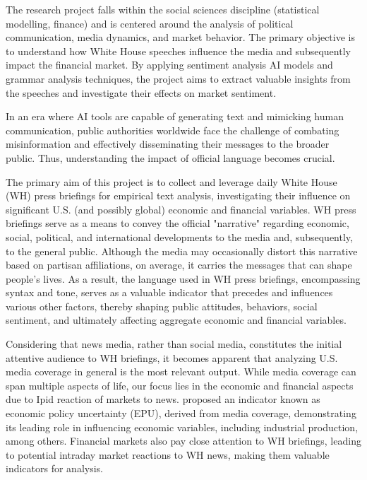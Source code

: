 \documentclass{article}
\begin{document}
The research project falls within the social sciences discipline (statistical modelling, finance) and is centered around
the analysis of political communication, media dynamics, and market behavior. The primary objective is to understand how
White House speeches influence the media and subsequently impact the financial market. By applying sentiment analysis AI
models and grammar analysis techniques, the project aims to extract valuable insights from the speeches and investigate
their effects on market sentiment.
\par
In an era where AI tools are capable of generating text and mimicking human communication, public authorities worldwide face the challenge of combating misinformation and effectively disseminating their messages to the broader public. Thus, understanding the impact of official language becomes crucial.
\par
The primary aim of this project is to collect and leverage daily White House (WH) press briefings for empirical text analysis, investigating their influence on significant U.S. (and possibly global) economic and financial variables. WH press briefings serve as a means to convey the official "narrative" regarding economic, social, political, and international developments to the media and, subsequently, to the general public. Although the media may occasionally distort this narrative based on partisan affiliations, on average, it carries the messages that can shape people's lives. As a result, the language used in WH press briefings, encompassing syntax and tone, serves as a valuable indicator that precedes and influences various other factors, thereby shaping public attitudes, behaviors, social sentiment, and ultimately affecting aggregate economic and financial variables.
\par
Considering that news media, rather than social media, constitutes the initial attentive audience to WH briefings, it becomes apparent that analyzing U.S. media coverage in general is the most relevant output. While media coverage can span multiple aspects of life, our focus lies in the economic and financial aspects due to Ipid reaction of markets to news. \cite{10.1093/qje/qjw024} proposed an indicator known as economic policy uncertainty (EPU), derived from media coverage, demonstrating its leading role in influencing economic variables, including industrial production, among others. Financial markets also pay close attention to WH briefings, leading to potential intraday market reactions to WH news, making them valuable indicators for analysis.
\end{document}
